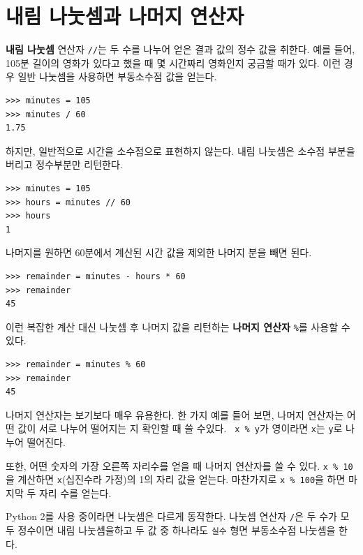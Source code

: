 \documentclass[10pt]{book}
\begin{document}
\section{내림 나눗셈과 나머지 연산자}

{\bf 내림 나눗셈} 연산자 \verb"//"는 두 수를 나누어 얻은 결과 값의 정수 값을 취한다.  예를 들어, 105분 길이의 영화가 있다고 했을 때 몇 시간짜리 영화인지 궁금할 때가 있다.  이런 경우 일반 나눗셈을 사용하면 부동소수점 값을 얻는다. 
\begin{verbatim}
>>> minutes = 105
>>> minutes / 60
1.75
\end{verbatim}

하지만, 일반적으로 시간을 소수점으로 표현하지 않는다. 내림 나눗셈은
소수점 부분을 버리고 정수부분만 리턴한다.


\begin{verbatim}
>>> minutes = 105
>>> hours = minutes // 60
>>> hours
1
\end{verbatim}

나머지를 원하면 60분에서 계산된 시간 값을 제외한 나머지 분을 빼면 된다. 

\begin{verbatim}
>>> remainder = minutes - hours * 60
>>> remainder
45
\end{verbatim}


이런 복잡한 계산 대신 나눗셈 후 나머지 값을 리턴하는 {\bf 나머지
  연산자} \verb"%"를 사용할 수 있다.

\begin{verbatim}
>>> remainder = minutes % 60
>>> remainder
45
\end{verbatim}
%
나머지 연산자는 보기보다 매우 유용한다.  한 가지 예를 들어 보면, 나머지
연산자는 어떤 값이 서로 나누어 떨어지는 지 확인할 때 쓸 수있다.  {\tt
  x \% y}가 영이라면 {\tt x}는 {\tt y}로 나누어 떨어진다.

또한, 어떤 숫자의 가장 오른쪽 자리수를 얻을 때 나머지 연산자를 쓸 수
있다.  {\tt x \% 10}을 계산하면 {\tt x}(십진수라 가정)의 1의 자리 값을
얻는다.  마찬가지로 {\tt x \% 100}을 하면 마지막 두 자리 수를 얻는다.

Python 2를 사용 중이라면 나눗셈은 다르게 동작한다.  나눗셈 연산자
\verb"/"은 두 수가 모두 정수이면 내림 나눗셈을하고 두 값 중 하나라도
{\tt 실수} 형면 부동소수점 나눗셈을 한다.
\end{document}
